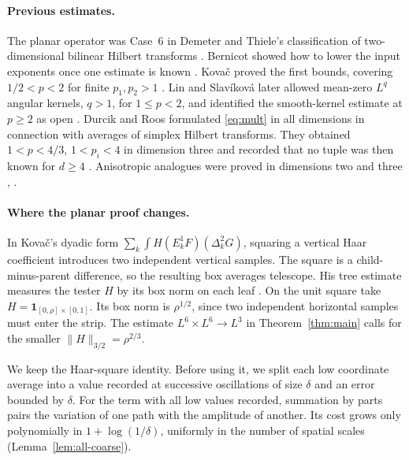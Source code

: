 \documentclass[11pt]{article}
\newcommand{\ind}{\mathbf 1}
\begin{document}
\paragraph{Previous estimates.}
The planar operator was Case~6 in Demeter and Thiele's classification
of two-dimensional bilinear Hilbert transforms \cite[Introduction]{DemeterThiele}.
Bernicot showed how to lower the input exponents once one estimate is
known \cite[Theorem~2]{Bernicot}. Kova\v{c} proved the first bounds,
covering \(1/2<p<2\) for finite \(p_1,p_2>1\)
\cite[Theorem~1 and (1.9)]{Kovac}. Lin and Slav\'ikov\'a later allowed
mean-zero \(L^q\) angular kernels, \(q>1\), for \(1\le p<2\), and
identified the smooth-kernel estimate at \(p\ge2\) as open
\cite[Theorem~1.1 and (1.4)]{LS}. Durcik and Roos formulated
\eqref{eq:mult} in all dimensions in connection with averages of simplex
Hilbert transforms. They obtained \(1<p<4/3\), \(1<p_i<4\) in dimension
three and recorded that no tuple was then known for \(d\ge4\)
\cite[(1.10) and Section~3]{DR}. Anisotropic analogues were proved in
dimensions two and three \cite[Theorem~2]{CDR}, \cite[Theorem~4]{DFR}.

\paragraph{Where the planar proof changes.}
In Kova\v{c}'s dyadic form \(\sum_k\int H(E_k^1 F)(\Delta_k^2G)\),
squaring a vertical Haar coefficient introduces two independent vertical
samples. The square is a child-minus-parent difference, so the resulting
box averages telescope. His tree estimate measures the tester \(H\) by
its box norm on each leaf \cite[Proposition~4]{Kovac}. On the unit
square take \(H=\ind_{[0,\rho]\times[0,1]}\). Its box norm is
\(\rho^{1/2}\), since two independent horizontal samples must enter
the strip. The estimate \(L^6\times L^6\to L^3\) in
Theorem~\ref{thm:main} calls for the smaller \(\|H\|_{3/2}=\rho^{2/3}\).

We keep the Haar-square identity. Before using it, we split each low
coordinate average into a value recorded at successive oscillations
of size \(\delta\) and an error bounded by \(\delta\).
For the term with all low values recorded, summation by parts pairs the
variation of one path with the amplitude of another. Its cost grows
only polynomially in \(1+\log(1/\delta)\), uniformly in the number of
spatial scales (Lemma~\ref{lem:all-coarse}).
\end{document}
